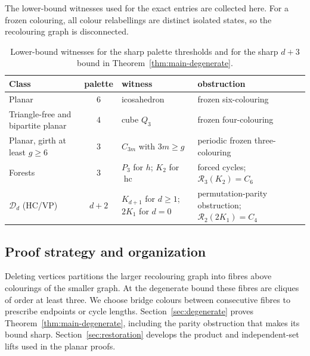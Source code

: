 \documentclass[11pt]{article}
\theoremstyle{remark}
\newcommand{\R}{\mathcal R}
\newcommand{\hc}{\operatorname{hc}}
\numberwithin{equation}{section}
\numberwithin{table}{section}
\begin{document}
The lower-bound witnesses used for the exact entries are collected here.
For a frozen colouring, all colour relabellings are distinct isolated
states, so the recolouring graph is disconnected.
\begin{table}[htbp]
\centering\small
\caption{Lower-bound witnesses for the sharp palette thresholds and for the
sharp $d+3$ bound in Theorem~\ref{thm:main-degenerate}.}
\label{tab:lower-witnesses}
\begin{tabularx}{0.94\linewidth}{@{}l c >{\raggedright\arraybackslash}X >{\raggedright\arraybackslash}X@{}}
\toprule
Class & palette & witness & obstruction\\
\midrule
Planar & $6$ & icosahedron & frozen six-colouring\\
Triangle-free and bipartite planar & $4$ & cube $Q_3$ & frozen four-colouring\\
Planar, girth at least $g\ge6$ & $3$ & $C_{3m}$ with $3m\ge g$
  & periodic frozen three-colouring\\
Forests & $3$ & $P_3$ for $h$; $K_2$ for $\hc$
  & forced cycles; $\R_3(K_2)=C_6$\\
$\mathcal D_d$ (HC/VP) & $d+2$ & $K_{d+1}$ for $d\ge1$; $2K_1$ for $d=0$
  & permutation-parity obstruction; $\R_2(2K_1)=C_4$\\
\bottomrule
\end{tabularx}
\end{table}

\subsection{Proof strategy and organization}
Deleting vertices partitions the larger recolouring graph into fibres
above colourings of the smaller graph. At the degenerate bound these
fibres are cliques of order at least three. We choose bridge colours
between consecutive fibres to prescribe endpoints or cycle lengths.
Section~\ref{sec:degenerate} proves Theorem~\ref{thm:main-degenerate},
including the parity obstruction that makes its bound sharp.
Section~\ref{sec:restoration} develops the product and independent-set
lifts used in the planar proofs.
\end{document}
